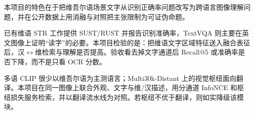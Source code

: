 \justifying
\NSFCBodyText

本项目的特色在于把维吾尔语场景文字从识别正确率问题改写为跨语言图像理解问题，并在公开数据上用消融与对照把主张限制为可证伪命题。


已有维语 STR 工作提供 SUST/RUST 并报告识别准确率\cite{kong2023sust,yang2024collaborative}，TextVQA 则主要在英文图像上证明“读字”的必要\cite{singh2019towards}。本项目检验的是：把维语文字区域特征送入融合表征后，汉$\leftrightarrow$维检索与理解是否提高。验收看去掉文字通道后 Recall@5 或准确率是否下降，而不是只看 OCR 分数。


多语 CLIP 很少以维吾尔语为主测语言\cite{chen2023altclip,chen2023mclip}；Multi30k-Distant 上的视觉枢纽面向翻译\cite{tayir2024visual}。本项目在同一图像上联合外观、文字与维/汉描述，用分通道 InfoNCE 和枢纽损失服务检索，并以翻译流水线为对照。若枢纽不优于翻译，则如实降级该模块。
